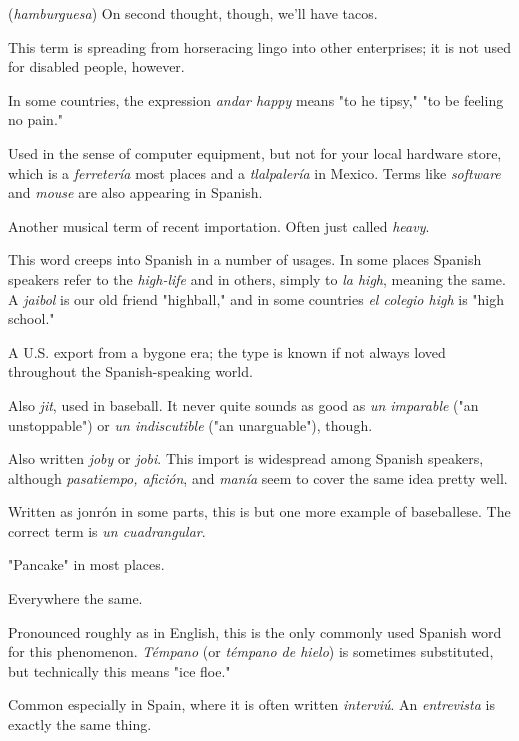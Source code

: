  (\emph{hamburguesa}) On second thought, though,
we'll have tacos.

 This term is spreading from horseracing lingo
into other enterprises; it is not used for disabled people, however.

 In some countries, the expression \emph{andar happy} means
"to he tipsy," "to be feeling no pain."

 Used in the sense of computer equipment, but
not for your local hardware store, which is a \emph{ferretería} most places and
a \emph{tlalpalería} in Mexico. Terms like \emph{software} and \emph{mouse} are also appearing in Spanish.

 Another musical term of recent importation.
Often just called \emph{heavy}.

 This word creeps into Spanish in a number of usages.
In some places Spanish speakers refer to the \emph{high-life} and in others,
simply to \emph{la high}, meaning the same. A \emph{jaibol} is our old friend "highball," and in some countries \emph{el colegio high} is "high school."

 A U.S. export from a bygone era; the type is known if
not always loved throughout the Spanish-speaking world.

 Also \emph{jit}, used in baseball. It never quite sounds as good as
\emph{un imparable} ("an unstoppable") or \emph{un indiscutible} ("an unarguable"),
though.

 Also written \emph{joby} or \emph{jobi}. This import is widespread
among Spanish speakers, although \emph{pasatiempo, afición}, and \emph{manía}
seem to cover the same idea pretty well.

 Written as jonrón in some parts, this is but one
more example of baseballese. The correct term is \emph{un cuadrangular}.

 "Pancake" in most places.

 Everywhere the same.

 Pronounced roughly as in English, this is the only
commonly used Spanish word for this phenomenon. \emph{Témpano} (or \emph{témpano de hielo}) is sometimes substituted, but technically this means
"ice floe."

 Common especially in Spain, where it is often
written \emph{interviú}. An \emph{entrevista} is exactly the same thing.


